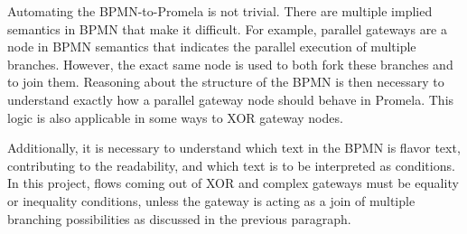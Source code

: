 Automating the BPMN-to-Promela is not trivial. There are multiple implied semantics in BPMN that make it difficult. For example, parallel gateways are a node in BPMN semantics that indicates the parallel execution of multiple branches. However, the exact same node is used to both fork these branches and to join them. Reasoning about the structure of the BPMN is then necessary to understand exactly how a parallel gateway node should behave in Promela. This logic is also applicable in some ways to XOR gateway nodes.

Additionally, it is necessary to understand which text in the BPMN is flavor text, contributing to the readability, and which text is to be interpreted as conditions. In this project, flows coming out of XOR and complex gateways must be equality or inequality conditions, unless the gateway is acting as a join of multiple branching possibilities as discussed in the previous paragraph.

